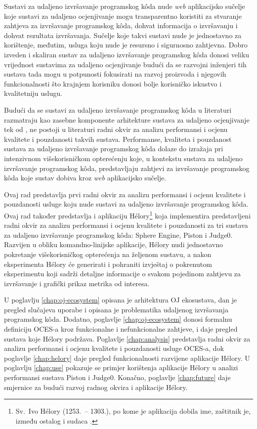 \documentclass[times, utf8, diplomski]{fer}
\begin{document}
Sustavi za udaljeno izvršavanje programskog kôda nude \textit{web} aplikacijsko sučelje koje sustavi za udaljeno ocjenjivanje mogu transparentno koristiti za stvaranje zahtjeva za izvršavanje programskog kôda, dohvat informacija o izvršavanju i dohvat rezultata izvršavanja. Sučelje koje takvi sustavi nude je jednostavno za korištenje, međutim, usluga koju nude je resursno i sigurnosno zahtjevna. Dobro izveden i skaliran sustav za udaljeno izvršavanje programskog kôda donosi veliku vrijednost sustavima za udaljeno ocjenjivanje budući da se razvojni inženjeri tih sustava tada mogu u potpunosti fokusirati na razvoj proizvoda i njegovih funkcionalnosti što krajnjem korisniku donosi bolje korisničko iskustvo i kvalitetniju uslugu.

Budući da se sustavi za udaljeno izvršavanje programskog kôda u literaturi razmatraju kao zasebne komponente arhitekture sustava za udaljeno ocjenjivanje tek od \citep{9245310}, ne postoji u literaturi radni okvir za analizu performansi i ocjenu kvalitete i pouzdanosti takvih sustava. Performanse, kvaliteta i pouzdanost sustava za udaljeno izvršavanje programskog kôda dolaze do izražaja pri intenzivnom višekorisničkom opterećenju koje, u kontekstu sustava za udaljeno izvršavanje programskog kôda, predstavljaju zahtjevi za izvršavanje programskog kôda koje sustav dobiva kroz \textit{web} aplikacijsko sučelje.

Ovaj rad predstavlja prvi radni okvir za analizu performansi i ocjenu kvalitete i pouzdanosti usluge koju nude sustavi za udaljeno izvršavanje programskog kôda. Ovaj rad također predstavlja i aplikaciju Hélory\footnote{Sv.\ Ivo Hélory (1253.\ -- 1303.), po kome je aplikacija dobila ime, zaštitnik je, između ostalog i sudaca .} koja implementira predstavljeni radni okvir za analizu performansi i ocjenu kvalitete i pouzdanosti za tri sustava za udaljeno izvršavanje programskog kôda: Sphere Engine, Piston i Judge0. Razvijen u obliku komandno-linijske aplikacije, Hélory nudi jednostavno pokretanje višekorisničkog opterećenja na željenom sustavu, a nakon eksperimenta Hélory će generirati i pohraniti izvještaj o pokrenutom eksperimentu koji sadrži detaljne informacije o svakom pojedinom zahtjevu za izvršavanje i grafički prikaz metrika od interesa.

U poglavlju \ref{chap:oj-ecosystem} opisana je arhitektura OJ ekosustava, dan je pregled slučajeva uporabe  i opisana je problematika udaljenog izvršavanja programskog kôda. Dodatno, poglavlje \ref{chap:oj-ecosystem} donosi formalnu definiciju OCES-a kroz funkcionalne i nefunkcionalne zahtjeve, i daje pregled sustava koje Hélory podržava. Poglavlje \ref{chap:analysis} predstavlja radni okvir za analizu performansi i ocjenu kvalitete i pouzdanosti usluge OCES-a, dok poglavlje \ref{chap:helory} daje pregled funkcionalnosti razvijene aplikacije Hélory. U poglavlju \ref{chap:use} pokazuje se primjer korištenja aplikacije Hélory u analizi performansi sustava Piston i Judge0. Konačno, poglavlje \ref{chap:future} daje smjernice za budući razvoj radnog okvira i aplikacije Hélory.
\end{document}
